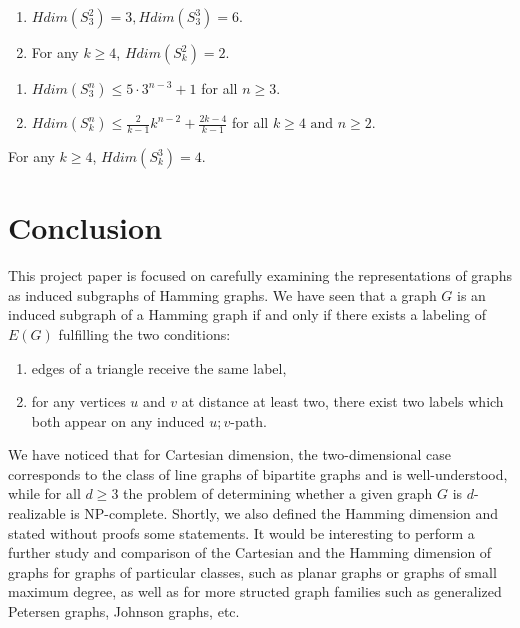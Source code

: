 \documentclass[12pt,a4paper,titlepage,openany]{report}
\begin{document}
\begin{proposition}
\begin{enumerate}[label=(\roman*)]
\item $Hdim(S_3^2)=3,Hdim(S_3^3)=6$.
\item For any $k\geq 4$, $Hdim(S_k^2)=2$. 
\end{enumerate}
\end{proposition}

\begin{theorem}
\begin{enumerate}[label=(\roman*)]
\item $Hdim(S_3^n)\leq 5\cdot 3^{n-3}+1$ for all $n\geq 3$.
\item $Hdim(S_k^n)\leq \frac{2}{k-1}k^{n-2}+\frac{2k-4}{k-1}$ for all $k\geq 4 \text{ and } n\geq 2$. 
\end{enumerate}
\end{theorem}

\begin{corollary}
For any $k\geq 4$, $Hdim(S_k^3)=4$.
\end{corollary}

\chapter{Conclusion}
This project paper is focused on carefully examining the representations of graphs as induced subgraphs of Hamming graphs. We have seen that a graph $G$ is an induced subgraph of a Hamming graph if and only if there exists a labeling of $E(G)$ fulfilling the two conditions:\begin{enumerate}
\item edges of a triangle receive the same label,
\item for any vertices $u$ and $v$ at distance at least two, there exist two labels which both appear on any induced $u; v$-path. 
\end{enumerate}
We have noticed that for Cartesian dimension, the two-dimensional case corresponds to the class of line graphs of bipartite graphs and is well-understood, while for all $d\geq 3$ the problem of determining whether a given graph $G$ is $d$-realizable is NP-complete.\newline
Shortly, we also defined the Hamming dimension and stated without proofs some statements.\newline
It would be interesting to perform a further study and comparison of the Cartesian and the Hamming dimension of graphs for graphs of particular classes, such as planar graphs or graphs of small maximum degree, as well as for more structed graph families such as generalized Petersen graphs, Johnson graphs, etc. 
\end{document}
